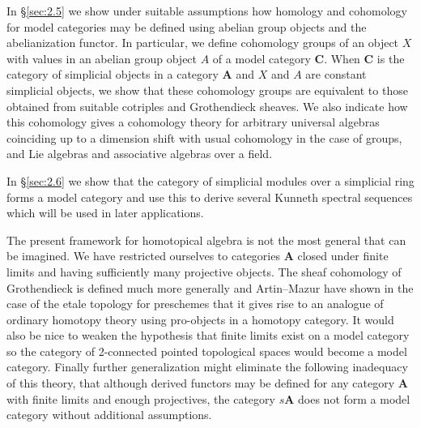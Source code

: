 \documentclass[../main]{subfiles}
\begin{document}
In \S\ref{sec:2.5} we show under suitable assumptions how homology and cohomology for model categories may be defined using abelian group objects and the abelianization functor. In particular, we define cohomology groups of an object $X$ with values in an abelian group object $A$ of a model category $\mathbf C$. When $\mathbf C$ is the category of simplicial objects in a category $\mathbf A$ and $X$ and $A$ are constant simplicial objects, we show that these cohomology groups are equivalent to those obtained from suitable cotriples and Grothendieck sheaves. We also indicate how this cohomology gives a cohomology theory for arbitrary universal algebras coinciding up to a dimension shift with usual cohomology in the case of groups, and Lie algebras and associative algebras over a field.

In \S\ref{sec:2.6} we show that the category of simplicial modules over a simplicial ring forms a model category and use this to derive several Kunneth spectral sequences which will be used in later applications.

The present framework for homotopical algebra is not the most general that can be imagined. We have restricted ourselves to categories $\mathbf A$ closed under finite limits and having sufficiently many projective objects. The sheaf cohomology of Grothendieck is defined much more generally and Artin--Mazur \cite{artin_homotopy_1967} have shown in the case of the etale topology for preschemes that it gives rise to an analogue of ordinary homotopy theory using pro-objects in a homotopy category. It would also be nice to weaken the hypothesis that finite limits exist on a model category so the category of 2-connected pointed topological spaces would become a model category. Finally further generalization might eliminate the following inadequacy of this theory, that although derived functors may be defined for any category $\mathbf A$ with finite limits and enough projectives, the category $s\mathbf A$ does not form a model category without additional assumptions.
\end{document}
